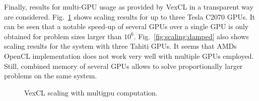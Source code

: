 \documentclass[final]{siamltex}
\newcommand{\figref}[1]{Fig.~\ref{#1}}
\begin{document}
Finally, results for multi-GPU usage as provided by VexCL in a transparent way are considered.
\figref{fig:scaling} shows scaling results for up to three Tesla C2070 GPUs.              
It can be seen that a notable speed-up of several GPUs over a single GPU is only obtained for problem sizes
larger than $10^6$.
\figref{fig:scaling:damped} also shows scaling results for the system with three Tahiti GPUs. %
It seems that AMDs OpenCL
implementation does not work very well with multiple GPUs employed. Still,
combined memory of several GPUs allows to solve proportionally larger problems
on the same system.

\begin{figure}
    \begin{center}
        \quad
        \quad
        \quad
    \end{center}
    \caption{VexCL scaling with multigpu computation.}
    \label{fig:scaling}
\end{figure}
\end{document}
